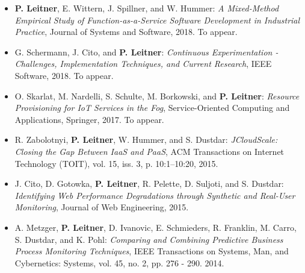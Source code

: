 \documentclass[paper=letter,fontsize=11pt]{scrartcl} %
\begin{document}
\begin{itemize}
	\item \textbf{P. Leitner}, E. Wittern, J. Spillner, and W. Hummer: \emph{A Mixed-Method Empirical Study of Function-as-a-Service Software Development in Industrial Practice}, Journal of Systems and Software, 2018. To appear.
	\item  G. Schermann, J. Cito, and \textbf{P. Leitner}: \emph{Continuous Experimentation - Challenges, Implementation Techniques, and Current Research}, IEEE Software, 2018. To appear.
	\item  O. Skarlat, M. Nardelli, S. Schulte, M. Borkowski, and \textbf{P. Leitner}: \emph{Resource Provisioning for IoT Services in the Fog}, Service-Oriented Computing and Applications, Springer, 2017. To appear.
  \item  R. Zabolotnyi, \textbf{P. Leitner}, W. Hummer, and S. Dustdar: \emph{JCloudScale: Closing the Gap Between IaaS and PaaS}, ACM Transactions on Internet Technology (TOIT),  vol. 15, iss. 3, p. 10:1–10:20, 2015.
  \item J. Cito, D. Gotowka, \textbf{P. Leitner}, R. Pelette, D. Suljoti, and S. Dustdar: \emph{Identifying Web Performance Degradations through Synthetic and Real-User Monitoring}, Journal of Web Engineering, 2015.
  \item  A. Metzger, \textbf{P. Leitner}, D. Ivanovic, E. Schmieders, R. Franklin, M. Carro, S. Dustdar, and K. Pohl: \emph{Comparing and Combining Predictive Business Process Monitoring Techniques}, IEEE Transactions on Systems, Man, and Cybernetics: Systems, vol. 45, no. 2, pp. 276 - 290. 2014.

\end{itemize}
\end{document}
